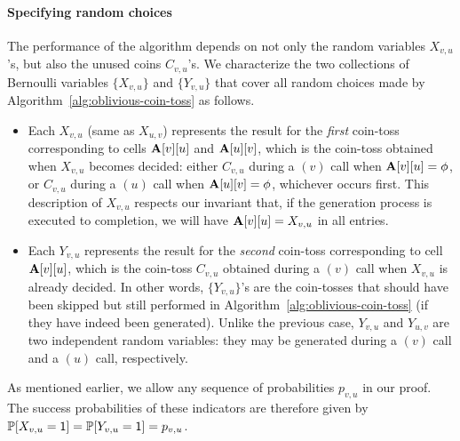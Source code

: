 \paragraph*{Specifying random choices} The performance of the algorithm depends on not only the random variables $X_{v,u}$'s, but also the unused coins $C_{v,u}$'s. We characterize the two collections of Bernoulli variables $\{X_{v,u}\}$ and $\{Y_{v,u}\}$ that cover all random choices made by Algorithm~\ref{alg:oblivious-coin-toss} as follows.

\begin{itemize}
\item Each $X_{v,u}$ (same as $X_{u,v}$) represents the result for the \emph{first} coin-toss corresponding to cells $\mathbf{A}[v][u]$ and $\mathbf{A}[u][v]$, which is the coin-toss obtained when $X_{v,u}$ becomes decided: either $C_{v,u}$ during a $(v)$ call when $\mathbf{A}[v][u] = \phi$, or $C_{v,u}$ during a $(u)$ call when $\mathbf{A}[u][v] = \phi$, whichever occurs first.
This description of $X_{v,u}$ respects our invariant that, if the generation process is executed to completion, we will have $\mathbf{A}[v][u]=X_{v,u}$ in all entries.
\item Each $Y_{v,u}$ represents the result for the \emph{second} coin-toss corresponding to cell $\mathbf{A}[v][u]$, which is the coin-toss $C_{v,u}$ obtained during a $(v)$ call when $X_{v,u}$ is already decided. In other words, $\{Y_{v,u}\}$'s are the coin-tosses that should have been skipped but still performed in Algorithm~\ref{alg:oblivious-coin-toss} (if they have indeed been generated). Unlike the previous case, $Y_{v,u}$ and $Y_{u,v}$ are two independent random variables: they may be generated during a $(v)$ call and a $(u)$ call, respectively.
\end{itemize}
As mentioned earlier, we allow any sequence of probabilities $p_{v,u}$ in our proof. The success probabilities of these indicators are therefore given by $\mathbb P[X_{v,u}=\mathsf{1}] = \mathbb P[Y_{v,u}=\mathsf{1}] = p_{v,u}$.

